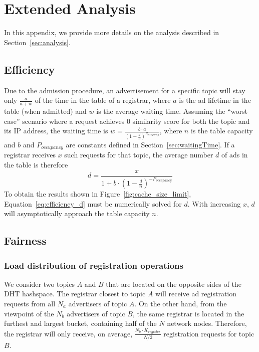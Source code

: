 
\appendix\label{sec:appendix}
\section{Extended Analysis}

In this appendix, we provide more details on the analysis described in Section~\ref{sec:analysis}.

\subsection{Efficiency}

Due to the admission procedure, an advertisement for a specific topic will stay only $\frac{a}{a+w}$ of the time in the table of a registrar, where $a$ is the ad lifetime in the table (when admitted) and $w$ is the average waiting time. Assuming the ``worst case'' scenario where a request achieves 0 similarity score for both the topic and its IP address, the waiting time is $w = \frac{b\cdot a}{(1 - \frac{d}{n})^{P_{occupancy}}}$, where $n$ is the table capacity and $b$ and $P_{occupancy}$ are constants defined in Section~\ref{sec:waitingTime}.
If a registrar receives $x$ such requests for that topic, the average number $d$ of ads in the table is therefore
\begin{equation}
d = \frac{x}{1 + b \cdot (1 - \frac{d}{n})^{-P_{occupancy}}} \label{eq:efficiency_d}
\end{equation}
To obtain the results shown in Figure~\ref{fig:cache_size_limit}, Equation~\ref{eq:efficiency_d} must be numerically solved for $d$. With increasing $x$, $d$ will asymptotically approach the table capacity $n$.

\subsection{Fairness}

\subsubsection{Load distribution of registration operations}

We consider two topics $A$ and $B$ that are located on the opposite sides of the DHT hashspace. The registrar closest to topic $A$ will receive ad registration requests from all $N_a$ advertisers of topic $A$. On the other hand, from the viewpoint of the $N_b$ advertisers of topic $B$, the same registrar is located in the furthest  and largest bucket, containing half of the $N$ network nodes. Therefore, the registrar will only receive, on average, $\frac{N_b\cdot K_{register}}{N/2}$ registration requests for topic $B$.

